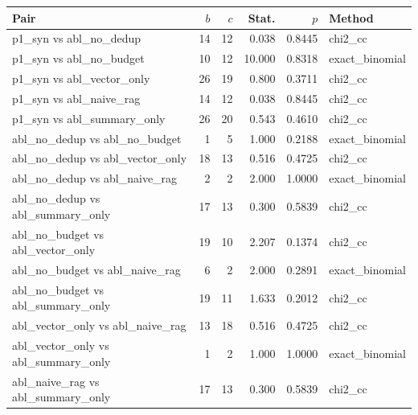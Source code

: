\begin{tabular}{lrrrrl}
\toprule
Pair & $b$ & $c$ & Stat. & $p$ & Method \\
\midrule
p1_syn vs abl_no_dedup & 14 & 12 & 0.038 & 0.8445 & chi2\_cc \\
p1_syn vs abl_no_budget & 10 & 12 & 10.000 & 0.8318 & exact\_binomial \\
p1_syn vs abl_vector_only & 26 & 19 & 0.800 & 0.3711 & chi2\_cc \\
p1_syn vs abl_naive_rag & 14 & 12 & 0.038 & 0.8445 & chi2\_cc \\
p1_syn vs abl_summary_only & 26 & 20 & 0.543 & 0.4610 & chi2\_cc \\
abl_no_dedup vs abl_no_budget & 1 & 5 & 1.000 & 0.2188 & exact\_binomial \\
abl_no_dedup vs abl_vector_only & 18 & 13 & 0.516 & 0.4725 & chi2\_cc \\
abl_no_dedup vs abl_naive_rag & 2 & 2 & 2.000 & 1.0000 & exact\_binomial \\
abl_no_dedup vs abl_summary_only & 17 & 13 & 0.300 & 0.5839 & chi2\_cc \\
abl_no_budget vs abl_vector_only & 19 & 10 & 2.207 & 0.1374 & chi2\_cc \\
abl_no_budget vs abl_naive_rag & 6 & 2 & 2.000 & 0.2891 & exact\_binomial \\
abl_no_budget vs abl_summary_only & 19 & 11 & 1.633 & 0.2012 & chi2\_cc \\
abl_vector_only vs abl_naive_rag & 13 & 18 & 0.516 & 0.4725 & chi2\_cc \\
abl_vector_only vs abl_summary_only & 1 & 2 & 1.000 & 1.0000 & exact\_binomial \\
abl_naive_rag vs abl_summary_only & 17 & 13 & 0.300 & 0.5839 & chi2\_cc \\
\bottomrule
\end{tabular}
